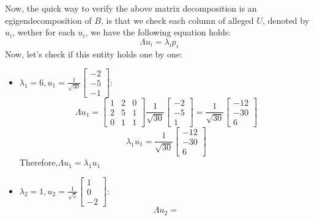 \begin{enumerate}
        Now, the quick way to verify the above matrix decomposition is an egigendecomposition of \(B\), is that 
        we check each column of alleged \(U\), denoted by \(u_i\), wether for each \(u_i\), we have the following equation holds:\\
        \[
            \Lambda u_i = \lambda_i p_i
        \]
        Now, let's check if this entity holds one by one:\\
        \begin{itemize}
            \item \( \lambda_1 = 6 , u_1 = \frac{1}{\sqrt{30}}\begin{bmatrix}
                -2 \\ -5 \\ -1
              \end{bmatrix} \):\\
            \[
                \Lambda u_1 = 
                \begin{bmatrix}
                     1 & 2 & 0 \\
                     2 & 5 & 1 \\
                     0 & 1 & 1 
                \end{bmatrix} \frac{1}{\sqrt{30}} 
                \begin{bmatrix}
                    -2 \\ -5 \\ 1
                \end{bmatrix} = \frac{1}{\sqrt{30}}\begin{bmatrix}
                    -12 \\ -30 \\ 6
                  \end{bmatrix}
            \]
            \[
                \lambda_1 u_1 = \frac{1}{\sqrt{30}} \begin{bmatrix}
                    -12 \\ -30 \\ 6
                  \end{bmatrix}
            \]
            Therefore,\(\Lambda u_1 = \lambda_1 u_1\)
        \item \( \lambda_2 = 1 , u_2 = \frac{1}{\sqrt{5}}\begin{bmatrix}
                1 \\ 0 \\ -2
              \end{bmatrix} \):\\
            \[
                \Lambda u_2 = 
\]
\end{itemize}
\end{enumerate}
